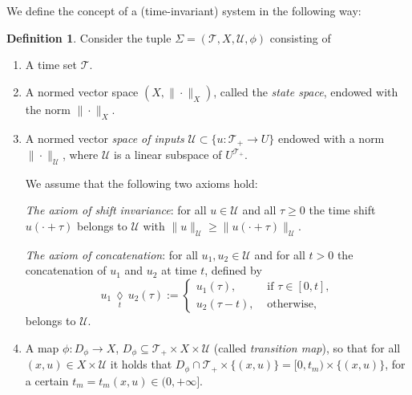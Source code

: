 \documentclass[twocolumn]{IEEEtran} %
\theoremstyle{definition}
\newtheorem{definition}[theorem]{Definition}
\newcommand{\tm}{\times}%
\newcommand{\Uc}{\mathcal{U}}%
\newcommand{\ccat}[3]{{#1\, \underset{#3}{\lozenge}\,{#2}}}%
\newcommand{\T}{\ensuremath{\mathcal{T}}}  %
\newcommand{\amc}[1]{{\color{blue} #1}}
\begin{document}
We define the concept of a (time-invariant) system in the following way:
\begin{definition}
\label{Steurungssystem}
Consider the tuple $\Sigma=(\T,X,\Uc,\phi)$ consisting of 
\begin{enumerate}[label = (\roman*)]  
		\item A time set $\T$.
    \item A normed vector space $(X,\|\cdot\|_X)$, called the \emph{state space}, endowed with the norm $\|\cdot\|_X$.
    \item A normed vector \emph{space of inputs} $\Uc \subset \{u:\T_+ \to U\}$ endowed with a norm $\|\cdot\|_{\Uc}$, 
		where $\Uc$ is a linear subspace of $U^{\T_+}$.
		
		We assume that the following two axioms hold:
                    
\emph{The axiom of shift invariance}: for all $u \in \Uc$ and all $\tau\geq0$ the time
shift $u(\cdot + \tau)$ belongs to $\Uc$ with \mbox{$\|u\|_\Uc \geq \|u(\cdot + \tau)\|_\Uc$}.

\emph{The axiom of concatenation}: for all $u_1,u_2 \in \Uc$ and for all $t>0$ the concatenation of $u_1$ and $u_2$ at time $t$, defined by
\begin{equation}
\ccat{u_1}{u_2}{t}(\tau):=
\begin{cases}
u_1(\tau), & \text{ if } \tau \in [0,t], \\ 
u_2(\tau-t),  & \text{ otherwise},
\end{cases}
\label{eq:Composed_Input}
\end{equation}
belongs to $\Uc$.


    \item A map $\phi:D_{\phi} \to X$, $D_{\phi}\subseteq \T_+ \times X \times \Uc$ (called \emph{transition map}), so that for all $(x,u)\in X \tm \Uc$ it holds that $D_{\phi} \cap \T_+ \times \{(x,u)\} = [0,t_m)\tm \{(x,u)\}$, for a certain $t_m=t_m(x,u)\in (0,+\infty]$.
		

\end{enumerate}
\end{definition}
\end{document}
